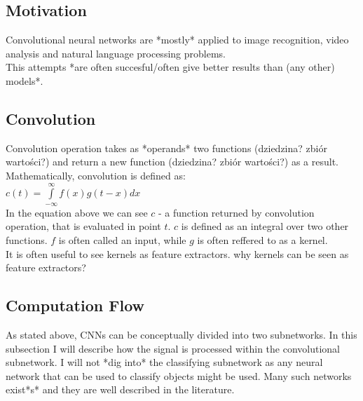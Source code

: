 \documentclass[a4paper,10pt]{report}
\begin{document}
      \subsection{Motivation} %
	Convolutional neural networks are *mostly* applied to image recognition, video analysis and natural language processing problems.\\ %
	This attempts *are often succesful/often give better results than (any other) models*.\\ %
	
      \subsection{Convolution} %
	Convolution operation takes as *operands* two functions (dziedzina? zbiór wartości?) and return a new function (dziedzina? zbiór wartości?) as a result. Mathematically, convolution is defined as: \\
	
	$c(t) = \int\limits_{-\infty}^\infty f(x)g(t-x)dx$ \\
	
	In the equation above we can see $c$ - a function returned by convolution operation, that is evaluated in point $t$. $c$ is defined as an integral over two other functions. $f$ is often called an input, while $g$ is often reffered to as a kernel.%
	  \\
	
	It is often useful to see kernels as feature extractors. %
	why kernels can be seen as feature extractors?\\
	
      \subsection{Computation Flow} %
	As stated above, CNNs can be conceptually divided into two subnetworks. In this subsection I will describe how the signal is processed within the convolutional subnetwork. I will not *dig into* the classifying subnetwork as any neural network that can be used to classify objects might be used. Many such networks exist*s* and they are well described in the literature. \\ %
	
\end{document}
